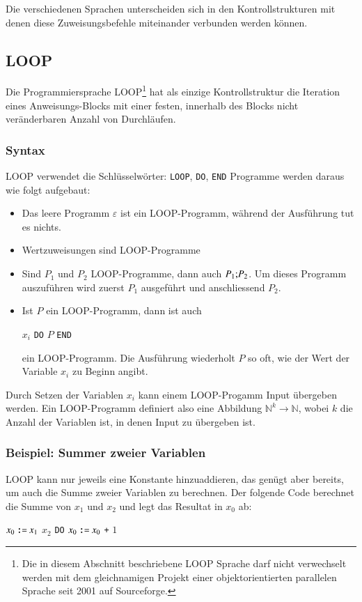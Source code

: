 Die verschiedenen Sprachen unterscheiden sich in den Kontrollstrukturen
mit denen diese Zuweisungsbefehle miteinander verbunden werden können.

\subsection{LOOP}
%
Die Programmiersprache
LOOP\footnote{Die in diesem Abschnitt beschriebene
LOOP Sprache darf nicht verwechselt werden mit dem gleichnamigen
Projekt einer objektorientierten parallelen Sprache seit
2001 auf Sourceforge.}
hat als einzige Kontrollstruktur die
Iteration eines Anweisungs-Blocks mit einer festen, innerhalb des
Blocks nicht veränderbaren Anzahl von Durchläufen.

\subsubsection{Syntax}
LOOP verwendet die 
Schlüsselwörter: {\tt LOOP}, {\tt DO}, {\tt END}
Programme werden daraus wie folgt aufgebaut:
\begin{itemize}
\item Das leere Programm $\varepsilon$ ist ein LOOP-Programm,
während der Ausführung tut es nichts.
\item Wertzuweisungen sind LOOP-Programme
\item Sind $P_1$ und $P_2$ LOOP-Programme, dann auch
$P_1{\tt ;}P_2$.
Um dieses Programm auszuführen wird zuerst $P_1$
ausgeführt und anschliessend $P_2$.
\item Ist $P$ ein LOOP-Programm, dann ist auch
\begin{algorithmic}
 $x_i$ {\tt DO} $P$ {\tt END}
\end{algorithmic}
ein LOOP-Programm.
Die Ausführung wiederholt $P$ so oft, wie der
Wert der Variable $x_i$  zu Beginn angibt.
\end{itemize}
Durch Setzen der Variablen $x_i$ kann einem LOOP-Progamm Input übergeben
werden.
Ein LOOP-Programm definiert also eine Abbildung $\mathbb N^k\to\mathbb N$,
wobei $k$ die Anzahl der Variablen ist, in denen Input zu übergeben ist.

\subsubsection{Beispiel: Summer zweier Variablen}
LOOP kann nur jeweils eine Konstante hinzuaddieren, das genügt aber
bereits, um auch die Summe zweier Variablen zu berechnen.
Der folgende
Code berechnet die Summe von $x_1$ und $x_2$ und legt das Resultat in
$x_0$ ab:
\begin{algorithmic}
\STATE $x_0 \mathbin{\texttt{:=}} x_1$
 $x_2$ {\tt DO}
\STATE{\tt \ \ \ \ }$x_0 \mathbin{\texttt{:=}} x_0$ {\tt +} $1$
\end{algorithmic}

